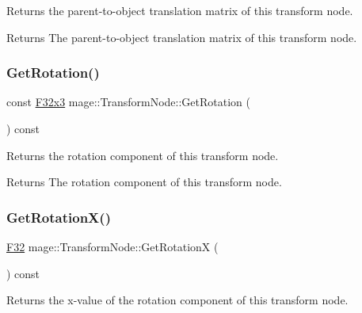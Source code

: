 Returns the parent-\/to-\/object translation matrix of this transform node.

\begin{DoxyReturn}{Returns}
The parent-\/to-\/object translation matrix of this transform node. 
\end{DoxyReturn}
\hypertarget{classmage_1_1_transform_node_a2419a1e60ce39eaf94c24de226e33a7a}{}\label{classmage_1_1_transform_node_a2419a1e60ce39eaf94c24de226e33a7a} 
\subsubsection{\texorpdfstring{Get\+Rotation()}{GetRotation()}}
{\footnotesize\ttfamily const \hyperlink{namespacemage_a73fbe0da4b8d5bc156bb8453e5b63a17}{F32x3} mage\+::\+Transform\+Node\+::\+Get\+Rotation (\begin{DoxyParamCaption}{ }\end{DoxyParamCaption}) const\hspace{0.3cm}{\ttfamily [noexcept]}}

Returns the rotation component of this transform node.

\begin{DoxyReturn}{Returns}
The rotation component of this transform node. 
\end{DoxyReturn}
\hypertarget{classmage_1_1_transform_node_a716a289997267d8bcda1da28cb679dcc}{}\label{classmage_1_1_transform_node_a716a289997267d8bcda1da28cb679dcc} 
\subsubsection{\texorpdfstring{Get\+Rotation\+X()}{GetRotationX()}}
{\footnotesize\ttfamily \hyperlink{namespacemage_aa97e833b45f06d60a0a9c4fc22ae02c0}{F32} mage\+::\+Transform\+Node\+::\+Get\+RotationX (\begin{DoxyParamCaption}{ }\end{DoxyParamCaption}) const\hspace{0.3cm}{\ttfamily [noexcept]}}

Returns the x-\/value of the rotation component of this transform node.

